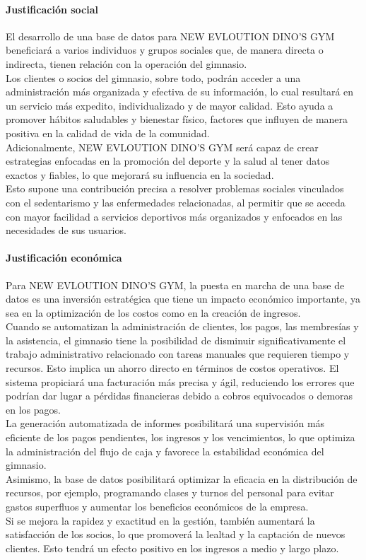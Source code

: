 \documentclass[12pt, letterpaper]{article}
\begin{document}
\paragraph{Justificación social}
El desarrollo de una base de datos para NEW EVLOUTION DINO'S GYM beneficiará a varios individuos y grupos sociales que, de manera directa o indirecta, tienen relación con la operación del gimnasio.\\ 
Los clientes o socios del gimnasio, sobre todo, podrán acceder a una administración más organizada y efectiva de su información, lo cual resultará en un servicio más expedito, individualizado y de mayor calidad. Esto ayuda a promover hábitos saludables y bienestar físico, factores que influyen de manera positiva en la calidad de vida de la comunidad.\\
Adicionalmente, NEW EVLOUTION DINO'S GYM será capaz de crear estrategias enfocadas en la promoción del deporte y la salud al tener datos exactos y fiables, lo que mejorará su influencia en la sociedad.\\ 
Esto supone una contribución precisa a resolver problemas sociales vinculados con el sedentarismo y las enfermedades relacionadas, al permitir que se acceda con mayor facilidad a servicios deportivos más organizados y enfocados en las necesidades de sus usuarios.
\newpage
\paragraph{Justificación económica}
Para NEW EVLOUTION DINO'S GYM, la puesta en marcha de una base de datos es una inversión estratégica que tiene un impacto económico importante, ya sea en la optimización de los costos como en la creación de ingresos.\\ 
Cuando se automatizan la administración de clientes, los pagos, las membresías y la asistencia, el gimnasio tiene la posibilidad de disminuir significativamente el trabajo administrativo relacionado con tareas manuales que requieren tiempo y recursos. Esto implica un ahorro directo en términos de costos operativos.
El sistema propiciará una facturación más precisa y ágil, reduciendo los errores que podrían dar lugar a pérdidas financieras debido a cobros equivocados o demoras en los pagos.\\ 
La generación automatizada de informes posibilitará una supervisión más eficiente de los pagos pendientes, los ingresos y los vencimientos, lo que optimiza la administración del flujo de caja y favorece la estabilidad económica del gimnasio.\\
Asimismo, la base de datos posibilitará optimizar la eficacia en la distribución de recursos, por ejemplo, programando clases y turnos del personal para evitar gastos superfluos y aumentar los beneficios económicos de la empresa.\\ 
Si se mejora la rapidez y exactitud en la gestión, también aumentará la satisfacción de los socios, lo que promoverá la lealtad y la captación de nuevos clientes. Esto tendrá un efecto positivo en los ingresos a medio y largo plazo.
\newpage
\end{document}
